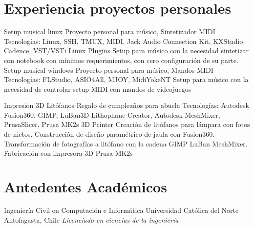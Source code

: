 \documentclass[draft,color,12pt,letterpaper,sans]{moderncv}
\begin{document}
\section{Experiencia proyectos personales}

\cventry {}
{Setup musical linux}
{Proyecto personal para m\'usico, Sintetizador MIDI}
{}
{\newline Tecnolog\'ias: Linux, SSH, TMUX, MIDI, Jack Audio Connection Kit, KXStudio Cadence, VST/VSTi Linux Plugins}
{Setup para m\'usico con la necesidad sintetizar con notebook con m\'inimos requerimientos, con cero configuraci\'on de su parte.\newline}
\cventry {}
{Setup musical windows}
{Proyecto personal para m\'usico, Mandos MIDI}
{}
{\newline Tecnolog\'ias: FLStudio, ASIO4All, MJOY, MidiYokeNT}
{Setup para m\'usico con la necesidad de controlar setup MIDI con mandos de videojuegos\newline}


\cventry {}
{Impresion 3D Lit\'ofanos}
{Regalo de cumpleaños para abuela}
{}
{\newline Tecnolog\'ias: Autodesk Fusion360, GIMP, LuBan3D Lithophane Creator, Autodesk MeshMixer, PrusaSlicer, Prusa MK2s 3D Printer}
{Creaci\'on de lit\'ofanos para l\'ampara con fotos de nietos. Construcci\'on de diseño param\'etrico de jaula con Fusion360.
Transformaci\'on de fotograf\'ias a lit\'ofano con la cadena GIMP \faArrowRight LuBan \faArrowRight MeshMixer. Fabricaci\'on con impresora 3D Prusa MK2s \newline}



\section{Antedentes Acad\'emicos}
{Ingenier\'ia Civil en Computaci\'on e Inform\'atica}
{Universidad Cat\'olica del Norte}
{Antofagasta, Chile}
{\textit{Licenciado en ciencias de la ingenier\'ia}}
{}
\end{document}
